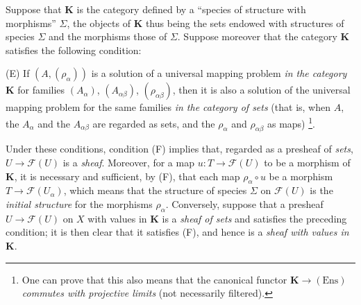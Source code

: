 \begin{env}[3.1.3]
\label{0.3.1.3}
Suppose that $\boldsymbol{K}$ is the category defined by a ``species of
structure with morphisms'' $\Sigma$, the objects of $\boldsymbol{K}$ thus being
the sets endowed with structures of species $\Sigma$ and the morphisms those of
$\Sigma$. Suppose moreover that the category $\boldsymbol{K}$ satisfies the
following condition:

\smallskip
\noindent
\textup{(E)} If $(A,(\rho_\alpha))$ is a solution of a universal mapping
problem \emph{in the category $\boldsymbol{K}$} for families
$(A_\alpha)$, $(A_{\alpha\beta})$, $(\rho_{\alpha\beta})$, then it is also
a solution of the universal mapping problem for the same families
\emph{in the category of sets} (that is, when $A$,
the $A_\alpha$ and the $A_{\alpha\beta}$ are regarded as sets, and the $\rho_\alpha$ and
$\rho_{\alpha\beta}$ as maps)%
\footnote{One can prove that this also means that the canonical functor
$\boldsymbol{K}\to(\mathrm{Ens})$ \emph{commutes with projective limits} (not
necessarily filtered).}.

Under these conditions, condition (F) implies that, regarded as a
presheaf of \emph{sets}, $U\to\mathcal{F}(U)$ is a \emph{sheaf}.
Moreover, for a map $u:T\to\mathcal{F}(U)$ to be a morphism of
$\boldsymbol{K}$, it is necessary and sufficient, by (F), that each map
$\rho_\alpha\circ u$ be a morphism $T\to\mathcal{F}(U_\alpha)$, which
means that the structure of species $\Sigma$ on $\mathcal{F}(U)$ is the
\emph{initial structure} for the morphisms $\rho_\alpha$. Conversely,
suppose that a presheaf $U\to\mathcal{F}(U)$ on $X$ with values in
$\boldsymbol{K}$ is a \emph{sheaf of sets} and satisfies the preceding
condition; it is then clear that it satisfies (F), and hence is a
\emph{sheaf with values in $\boldsymbol{K}$}.
\end{env}

